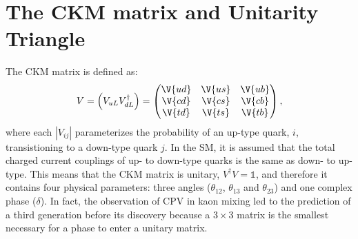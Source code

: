 \section{The CKM matrix and Unitarity Triangle}
\label{sec:ckm}

The CKM matrix is defined as:
\begin{equation}
  V = \left(V_{uL}V_{dL}^\dagger\right) =
  \begin{pmatrix}
    \V{ud} & \V{us} & \V{ub} \\
    \V{cd} & \V{cs} & \V{cb} \\
    \V{td} & \V{ts} & \V{tb} \\
  \end{pmatrix},
\end{equation}
where each $|V_{ij}|$ parameterizes the probability of an up-type quark, $i$, transistioning to a
down-type quark $j$.
In the SM, it is assumed that the total charged current couplings of up- to down-type quarks is the
same as down- to up-type.
This means that the CKM matrix is unitary, $V^\dagger V = \mathbb{1}$, and therefore it contains
four physical parameters: three angles ($\theta_{12}$, $\theta_{13}$ and $\theta_{23}$) and one
complex phase ($\delta$).
In fact, the observation of CPV in kaon mixing led to the prediction of a third generation before
its discovery because a $3\times3$ matrix is the smallest necessary for a phase to enter a unitary
matrix.



